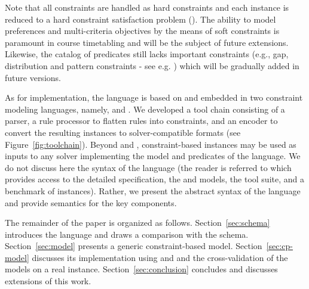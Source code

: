 Note that all constraints are handled as hard constraints and each {\UTP} instance is reduced to a hard constraint satisfaction problem ({\CSP}).
The ability to model preferences and multi-criteria objectives by the means of soft constraints is paramount in course timetabling and will be the subject of future extensions. 
Likewise, the catalog of {\UTP} predicates still lacks important constraints (e.g., gap, distribution and pattern constraints - see e.g. \cite{2017_aizam_AIPCP,2021_chen_IEEEA}) which will be gradually added in future versions.

As for implementation, the \UTP{} language is based on \XML{} and embedded in two constraint modeling languages, namely, 
{\MINIZINC} \cite{2007_nethercote_SPH,MINIZINC} and {\CHR} \cite{1994_fruhwirth_Chap}. 
We developed a tool chain consisting of a \XML{} parser, a rule processor to flatten rules into constraints, and an encoder to convert the resulting instances to solver-compatible formats %
(see Figure~\ref{fig:toolchain}). 
Beyond {\MINIZINC} and {\CHR}, constraint-based {\UTP} instances may be used as inputs to any solver implementing the model and predicates of the \UTP{} language.
We do not discuss here the \XML{} syntax of the language (the reader is referred to \cite{uspSite} which provides access to the detailed specification, %
the {\MINIZINC} and {\CHR} models, the tool suite, and a benchmark of instances).
Rather, we present the abstract syntax of the \UTP{} language and provide semantics for the key components.

The remainder of the paper is organized as follows.
Section~\ref{sec:schema} introduces the {\UTP} language and draws a comparison with %
the {\ITC} schema.
Section~\ref{sec:model} presents a generic constraint-based {\UTP} model.
Section~\ref{sec:cp-model} discusses its implementation using {\MINIZINC} and {\CHR}
and the cross-validation of the models on a real instance. 
Section~\ref{sec:conclusion} concludes and discusses extensions of this work.